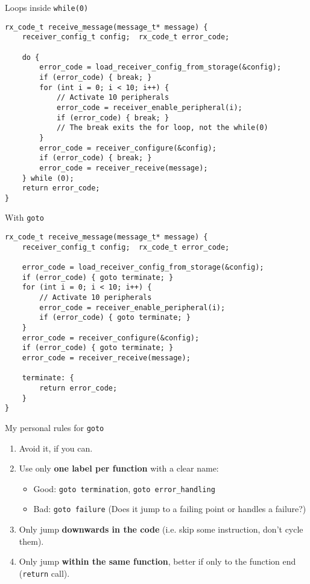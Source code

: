\documentclass[aspectratio=169,14pt]{beamer}
\begin{document}
\begin{frame}[fragile]{Loops inside \texttt{while(0)}}
\begin{lstlisting}[style=cstyle]
rx_code_t receive_message(message_t* message) {
    receiver_config_t config;  rx_code_t error_code;
    
    do {
        error_code = load_receiver_config_from_storage(&config);
        if (error_code) { break; }
        for (int i = 0; i < 10; i++) {
            // Activate 10 peripherals
            error_code = receiver_enable_peripheral(i);
            if (error_code) { break; }
            // The break exits the for loop, not the while(0)
        }
        error_code = receiver_configure(&config);
        if (error_code) { break; }
        error_code = receiver_receive(message);
    } while (0);
    return error_code;
}
\end{lstlisting}
\end{frame}


\begin{frame}[fragile]{With \texttt{goto}}
\begin{lstlisting}[style=cstyle]
rx_code_t receive_message(message_t* message) {
    receiver_config_t config;  rx_code_t error_code;
    
    error_code = load_receiver_config_from_storage(&config);
    if (error_code) { goto terminate; }
    for (int i = 0; i < 10; i++) {
        // Activate 10 peripherals
        error_code = receiver_enable_peripheral(i);
        if (error_code) { goto terminate; }
    }
    error_code = receiver_configure(&config);
    if (error_code) { goto terminate; }
    error_code = receiver_receive(message);
    
    terminate: {
        return error_code;
    }
}
\end{lstlisting}
\end{frame}

\begin{frame}{My personal rules for \texttt{goto}}
\begin{enumerate}
    \item Avoid it, if you can.
    \item Use only \textbf{one label per function} with a clear name:
        \begin{itemize}
            \item Good: \texttt{goto termination}, \texttt{goto error\_handling}
            \item Bad: \texttt{goto failure}  (Does it jump to a failing point or handles a failure?)
        \end{itemize}
    \item Only jump \textbf{downwards in the code} (i.e. skip some instruction, don’t cycle them).
    \item Only jump \textbf{within the same function}, better if only to the function end (\texttt{return} call).
\end{enumerate}
\end{frame}
\end{document}
